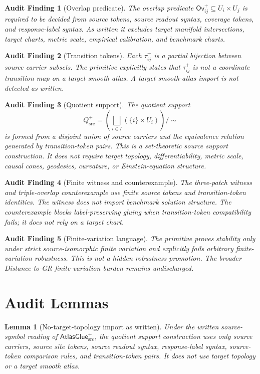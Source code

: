 \documentclass[11pt]{article}
\newcommand{\AtlasGlue}{\mathsf{AtlasGlue}_{\mathrm{src}}^{+}}
\newcommand{\Ov}{\mathsf{Ov}^{+}}
\newcommand{\Qsrc}{Q_{\mathrm{src}}^{+}}
\newcommand{\Disj}{\bigsqcup}
\newtheorem{lemma}{Lemma}
\newtheorem{audit}{Audit Finding}
\begin{document}
\begin{audit}[Overlap predicate]
The overlap predicate \(\Ov_{ij}\subseteq U_i\times U_j\) is required to be
decided from source tokens, source readout syntax, coverage tokens, and
response-label syntax. As written it excludes target manifold intersections,
target charts, metric scale, empirical calibration, and benchmark charts.
\end{audit}

\begin{audit}[Transition tokens]
Each \(\tau_{ij}^+\) is a partial bijection between source carrier subsets.
The primitive explicitly states that \(\tau_{ij}^+\) is not a coordinate
transition map on a target smooth atlas. A target smooth-atlas import is not
detected as written.
\end{audit}

\begin{audit}[Quotient support]
The quotient support
\[
  \Qsrc = \left(\Disj_{i\in I}(\{i\}\times U_i)\right)/{\sim}
\]
is formed from a disjoint union of source carriers and the equivalence
relation generated by transition-token pairs. This is a set-theoretic source
support construction. It does not require target topology, differentiability,
metric scale, causal cones, geodesics, curvature, or Einstein-equation
structure.
\end{audit}

\begin{audit}[Finite witness and counterexample]
The three-patch witness and triple-overlap counterexample use finite source
tokens and transition-token identities. The witness does not import benchmark
solution structure. The counterexample blocks label-preserving gluing when
transition-token compatibility fails; it does not rely on a target chart.
\end{audit}

\begin{audit}[Finite-variation language]
The primitive proves stability only under strict source-isomorphic finite
variation and explicitly fails arbitrary finite-variation robustness. This is
not a hidden robustness promotion. The broader Distance-to-GR
finite-variation burden remains undischarged.
\end{audit}

\section{Audit Lemmas}

\begin{lemma}[No-target-topology import as written]
Under the written source-symbol reading of \(\AtlasGlue\), the quotient
support construction uses only source carriers, source site tokens, source
readout syntax, response-label syntax, source-token comparison rules, and
transition-token pairs. It does not use target topology or a target smooth
atlas.
\end{lemma}
\end{document}
